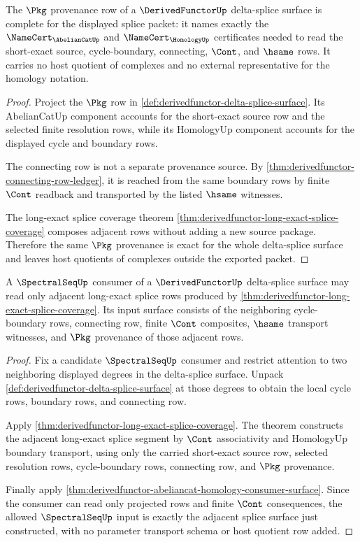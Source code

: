 \begin{theorem}\label{thm:derivedfunctor-triangle-splice-provenance-exactness}
The $\Pkg$ provenance row of a $\DerivedFunctorUp$ delta-splice surface is complete for the displayed splice packet: it names exactly the $\NameCert_{\AbelianCatUp}$ and $\NameCert_{\HomologyUp}$ certificates needed to read the short-exact source, cycle-boundary, connecting, $\Cont$, and $\hsame$ rows. It carries no host quotient of complexes and no external representative for the homology notation.
\end{theorem}
\begin{proof}
Project the $\Pkg$ row in \autoref{def:derivedfunctor-delta-splice-surface}. Its AbelianCatUp component accounts for the short-exact source row and the selected finite resolution rows, while its HomologyUp component accounts for the displayed cycle and boundary rows.

The connecting row is not a separate provenance source. By \autoref{thm:derivedfunctor-connecting-row-ledger}, it is reached from the same boundary rows by finite $\Cont$ readback and transported by the listed $\hsame$ witnesses.

The long-exact splice coverage theorem \autoref{thm:derivedfunctor-long-exact-splice-coverage} composes adjacent rows without adding a new source package. Therefore the same $\Pkg$ provenance is exact for the whole delta-splice surface and leaves host quotients of complexes outside the exported packet.
\end{proof}

\begin{theorem}\label{thm:derivedfunctor-spectral-sequence-input-surface}
A $\SpectralSeqUp$ consumer of a $\DerivedFunctorUp$ delta-splice surface may read only adjacent long-exact splice rows produced by \autoref{thm:derivedfunctor-long-exact-splice-coverage}. Its input surface consists of the neighboring cycle-boundary rows, connecting row, finite $\Cont$ composites, $\hsame$ transport witnesses, and $\Pkg$ provenance of those adjacent rows.
\end{theorem}
\begin{proof}
Fix a candidate $\SpectralSeqUp$ consumer and restrict attention to two neighboring displayed degrees in the delta-splice surface. Unpack \autoref{def:derivedfunctor-delta-splice-surface} at those degrees to obtain the local cycle rows, boundary rows, and connecting row.

Apply \autoref{thm:derivedfunctor-long-exact-splice-coverage}. The theorem constructs the adjacent long-exact splice segment by $\Cont$ associativity and HomologyUp boundary transport, using only the carried short-exact source row, selected resolution rows, cycle-boundary rows, connecting row, and $\Pkg$ provenance.

Finally apply \autoref{thm:derivedfunctor-abeliancat-homology-consumer-surface}. Since the consumer can read only projected rows and finite $\Cont$ consequences, the allowed $\SpectralSeqUp$ input is exactly the adjacent splice surface just constructed, with no parameter transport schema or host quotient row added.
\end{proof}

